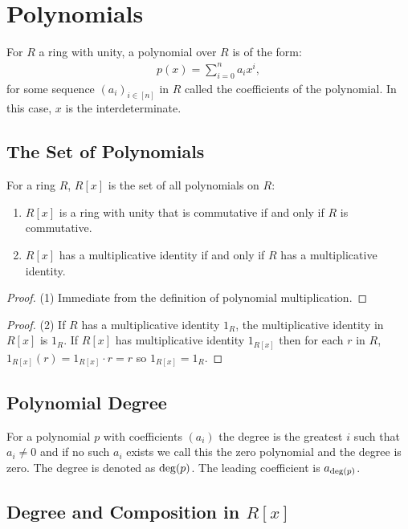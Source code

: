 \section{Polynomials}

For $R$ a ring with unity, a polynomial over $R$ is of the form: \begin{gather*}
  p(x) = \sum_{i = 0}^n a_ix^i,
\end{gather*} for some sequence $(a_i)_{i \in [n]}$ in $R$ called the coefficients
of the polynomial. In this case, $x$ is the interdeterminate.

\subsection{The Set of Polynomials}

For a ring $R$, $R[x]$ is the set of all polynomials on $R$: 
\begin{enumerate}
    \item $R[x]$ is a ring with unity that is commutative if and only if 
    $R$ is commutative.
    \item $R[x]$ has a multiplicative identity if and only
    if $R$ has a multiplicative identity.
\end{enumerate}
\begin{proof}
    (1) Immediate from the definition of polynomial multiplication.
\end{proof}
\begin{proof}
    (2) If $R$ has a multiplicative identity $1_R$, the multiplicative
    identity in $R[x]$ is $1_R$. If $R[x]$ has multiplicative identity
    $1_{R[x]}$ then for each $r$ in $R$, $1_{R[x]}(r) = 1_{R[x]} \cdot r = r$
    so $1_{R[x]} = 1_R$.
\end{proof}

\subsection{Polynomial Degree}

For a polynomial $p$ with coefficients $(a_i)$ the degree is the greatest 
$i$ such that $a_i \neq 0$ and if no such $a_i$ exists we call this 
the zero polynomial and the degree is zero. The degree is denoted as 
$\operatorname{deg}(p)$. The leading coefficient is $a_{\operatorname{deg}(p)}$.

\subsection{Degree and Composition in $R[x]$}

